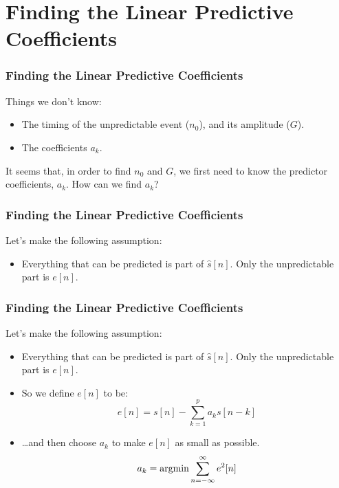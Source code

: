 \documentclass{beamer}
\newcommand{\argmin}{\operatornamewithlimits{argmin}}
\begin{document}
\section[Predictors]{Finding the Linear Predictive Coefficients}
\setcounter{subsection}{1}

\begin{frame}
  \frametitle{Finding the Linear Predictive Coefficients}

  Things we don't know:
  \begin{itemize}
  \item The timing of the unpredictable event ($n_0$), and its
    amplitude ($G$).
  \item The coefficients $a_k$.
  \end{itemize}
  It seems that, in order to find $n_0$ and $G$, we first need to know
  the predictor coefficients, $a_k$.  How can we find $a_k$?
\end{frame}

\begin{frame}
  \frametitle{Finding the Linear Predictive Coefficients}

  Let's make the following assumption:
  \begin{itemize}
  \item Everything that can be predicted is part of $\hat{s}[n]$.
    Only the unpredictable part is $e[n]$.
  \end{itemize}
\end{frame}
  
\begin{frame}
  \frametitle{Finding the Linear Predictive Coefficients}

  Let's make the following assumption:
  \begin{itemize}
  \item Everything that can be predicted is part of $\hat{s}[n]$.
    Only the unpredictable part is $e[n]$.
  \item So we define $e[n]$ to be:
    \begin{displaymath}
      e[n] = s[n] -\sum_{k=1}^p a_k s[n-k]
    \end{displaymath}
  \item \ldots and then choose $a_k$ to make $e[n]$ as small as possible.
    \begin{displaymath}
      a_k = \argmin \sum_{n=-\infty}^\infty e^2[n]
    \end{displaymath}
  \end{itemize}
\end{frame}
  
\end{document}
